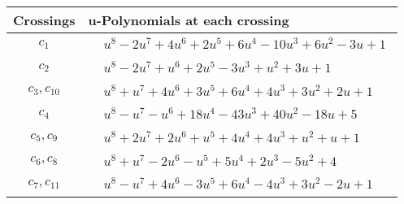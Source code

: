 \documentclass[1p]{elsarticle_modified}
\theoremstyle{definition}
\begin{document}
\begin{tabular}{m{50pt}|m{274pt}}
Crossings & \hspace{64pt}u-Polynomials at each crossing \\
\hline $$\begin{aligned}c_{1}\end{aligned}$$&$\begin{aligned}
&u^8-2 u^7+4 u^6+2 u^5+6 u^4-10 u^3+6 u^2-3 u+1
\end{aligned}$\\
\hline $$\begin{aligned}c_{2}\end{aligned}$$&$\begin{aligned}
&u^8-2 u^7+u^6+2 u^5-3 u^3+u^2+3 u+1
\end{aligned}$\\
\hline $$\begin{aligned}c_{3},c_{10}\end{aligned}$$&$\begin{aligned}
&u^8+u^7+4 u^6+3 u^5+6 u^4+4 u^3+3 u^2+2 u+1
\end{aligned}$\\
\hline $$\begin{aligned}c_{4}\end{aligned}$$&$\begin{aligned}
&u^8- u^7- u^6+18 u^4-43 u^3+40 u^2-18 u+5
\end{aligned}$\\
\hline $$\begin{aligned}c_{5},c_{9}\end{aligned}$$&$\begin{aligned}
&u^8+2 u^7+2 u^6+u^5+4 u^4+4 u^3+u^2+u+1
\end{aligned}$\\
\hline $$\begin{aligned}c_{6},c_{8}\end{aligned}$$&$\begin{aligned}
&u^8+u^7-2 u^6- u^5+5 u^4+2 u^3-5 u^2+4
\end{aligned}$\\
\hline $$\begin{aligned}c_{7},c_{11}\end{aligned}$$&$\begin{aligned}
&u^8- u^7+4 u^6-3 u^5+6 u^4-4 u^3+3 u^2-2 u+1
\end{aligned}$\\
\hline
\end{tabular}\\~\\
\end{document}
